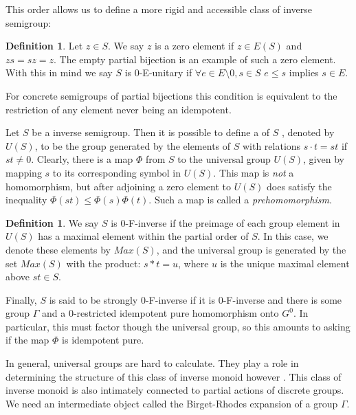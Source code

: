 \documentclass[11pt,a4paper]{amsart}
\theoremstyle{plain}
\theoremstyle{definition}%
\newtheorem{definition}[theorem]{Definition}%
\theoremstyle{remark}%
\begin{document}
This order allows us to define a more rigid and accessible class of inverse semigroup:

\begin{definition}
Let $z \in S$. We say $z$ is a zero element if $z \in E(S)$ and $zs=sz=z$. The empty partial bijection is an example of such a zero element. With this in mind we say $S$ is 0-E-unitary if $\forall e \in E\setminus 0, s \in S$ $e \leq s$ implies $s \in E$.
\end{definition}

For concrete semigroups of partial bijections this condition is equivalent to the restriction of any element never being an idempotent.

Let $S$ be a inverse semigroup. Then it is possible to define a  of $S$ \cite{}, denoted by $U(S)$, to be the group generated by the elements of $S$ with relations $s\cdot t = st$ if $st \not = 0$. Clearly, there is a map $\Phi$ from $S$ to the universal group $U(S)$, given by mapping $s$ to its corresponding symbol in $U(S)$. This map is \textit{not} a homomorphism, but after adjoining a zero element to $U(S)$ does satisfy the inequality $\Phi(st) \leq \Phi(s)\Phi(t)$. Such a map is called a \textit{prehomomorphism}. 

\begin{definition}
We say $S$ is 0-F-inverse if the preimage of each group element in $U(S)$ has a maximal element within the partial order of $S$. In this case, we denote these elements by $Max(S)$, and the universal group is generated by the set $Max(S)$ with the product: $s\ast t = u$, where $u$ is the unique maximal element above $st \in S$. 

Finally, $S$ is said to be strongly $0$-F-inverse if it is $0$-F-inverse and there is some group $\Gamma$ and a $0$-restricted idempotent pure homomorphism onto $G^{0}$. In particular, this must factor though the universal group, so this amounts to asking if the map $\Phi$ is idempotent pure.
\end{definition}

In general, universal groups are hard to calculate. They play a role in determining the structure of this class of inverse monoid however \cite{}. This class of inverse monoid is also intimately connected to partial actions of discrete groups. We need an intermediate object called the Birget-Rhodes expansion of a group $\Gamma$.
\end{document}
